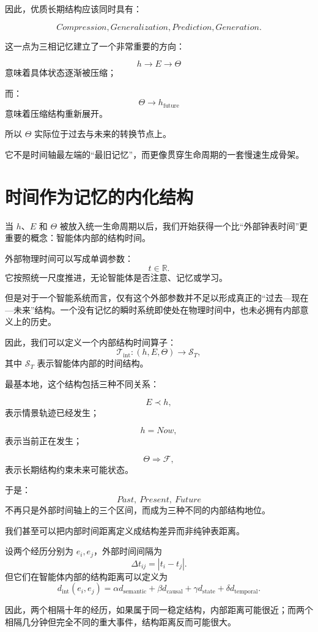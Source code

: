 因此，优质长期结构应该同时具有：

\[
Compression,
Generalization,
Prediction,
Generation.
\]

这一点为三相记忆建立了一个非常重要的方向：

\[
h
\rightarrow
E
\rightarrow
\Theta
\]
意味着具体状态逐渐被压缩；

而：
\[
\Theta
\rightarrow
h_{\mathrm{future}}
\]
意味着压缩结构重新展开。

所以 \(\Theta\) 实际位于过去与未来的转换节点上。

它不是时间轴最左端的“最旧记忆”，而更像贯穿生命周期的一套慢速生成骨架。

\section{时间作为记忆的内化结构}

当 \(h\)、\(E\) 和 \(\Theta\) 被放入统一生命周期以后，我们开始获得一个比“外部钟表时间”更重要的概念：智能体内部的结构时间。

外部物理时间可以写成单调参数：
\[
t\in\mathbb R.
\]
它按照统一尺度推进，无论智能体是否注意、记忆或学习。

但是对于一个智能系统而言，仅有这个外部参数并不足以形成真正的“过去—现在—未来”结构。一个没有记忆的瞬时系统即使处在物理时间中，也未必拥有内部意义上的历史。

因此，我们可以定义一个内部结构时间算子：
\[
\mathcal T_{\mathrm{int}}
:
(h,E,\Theta)
\rightarrow
\mathcal S_T,
\]
其中 \(\mathcal S_T\) 表示智能体内部的时间结构。

最基本地，这个结构包括三种不同关系：

\[
E
\prec
h,
\]
表示情景轨迹已经发生；

\[
h
=
Now,
\]
表示当前正在发生；

\[
\Theta
\Rightarrow
\mathcal F,
\]
表示长期结构约束未来可能状态。

于是：
\[
\boxed{
Past,\ Present,\ Future
}
\]
不再只是外部时间轴上的三个区间，而成为三种不同的内部结构地位。

我们甚至可以把内部时间距离定义成结构差异而非纯钟表距离。

设两个经历分别为 \(e_i,e_j\)，外部时间间隔为
\[
\Delta t_{ij}=|t_i-t_j|.
\]
但它们在智能体内部的结构距离可以定义为
\[
d_{\mathrm{int}}(e_i,e_j)
=
\alpha d_{\mathrm{semantic}}
+
\beta d_{\mathrm{causal}}
+
\gamma d_{\mathrm{state}}
+
\delta d_{\mathrm{temporal}}.
\]

因此，两个相隔十年的经历，如果属于同一稳定结构，内部距离可能很近；而两个相隔几分钟但完全不同的重大事件，结构距离反而可能很大。

